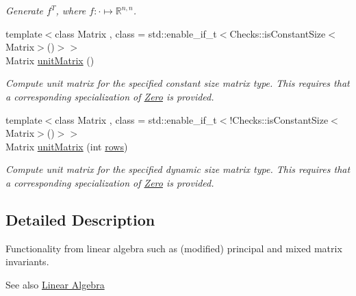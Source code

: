 \begin{DoxyCompactItemize}
\begin{DoxyCompactList}\small\item\em \-Generate $f^T$, where $f:\cdot\mapsto\mathbb{R}^{n,n} $. \end{DoxyCompactList}\item 
{\footnotesize template$<$class Matrix , class  = std\-::enable\-\_\-if\-\_\-t$<$\-Checks\-::is\-Constant\-Size$<$\-Matrix$>$()$>$$>$ }\\\-Matrix \hyperlink{group__LinearAlgebraGroup_ga88a596b8526c0ed98ce241244fb85948}{unit\-Matrix} ()
\begin{DoxyCompactList}\small\item\em \-Compute unit matrix for the specified constant size matrix type. \-This requires that a corresponding specialization of \hyperlink{structFunG_1_1Zero}{\-Zero} is provided. \end{DoxyCompactList}\item 
{\footnotesize template$<$class Matrix , class  = std\-::enable\-\_\-if\-\_\-t$<$!\-Checks\-::is\-Constant\-Size$<$\-Matrix$>$()$>$$>$ }\\\-Matrix \hyperlink{group__LinearAlgebraGroup_gae50c49f62ed072019079a7563688e5de}{unit\-Matrix} (int \hyperlink{namespaceFunG_1_1LinearAlgebra_abd3afa2fcd2194787342b2662cfa9f5a}{rows})
\begin{DoxyCompactList}\small\item\em \-Compute unit matrix for the specified dynamic size matrix type. \-This requires that a corresponding specialization of \hyperlink{structFunG_1_1Zero}{\-Zero} is provided. \end{DoxyCompactList}\end{DoxyCompactItemize}


\subsection{\-Detailed \-Description}
\-Functionality from linear algebra such as (modified) principal and mixed matrix invariants. \begin{DoxySeeAlso}{\-See also}
\hyperlink{group__LinearAlgebraGroup}{\-Linear Algebra} 
\end{DoxySeeAlso}


